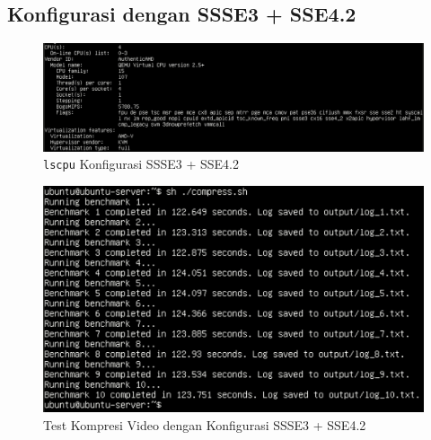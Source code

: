 \subsection{Konfigurasi dengan SSSE3 + SSE4.2}
\begin{figure}
    \centering
    \includegraphics[width=1\textwidth]
    {assets/pics/video-compression-test/lscpu_ssse3,sse4.2.jpeg}
    \caption{\texttt{lscpu} Konfigurasi SSSE3 + SSE4.2}
    \label{fig:lscpu_video_compression_test_ssse3,sse4.2}
\end{figure}

\begin{figure}
    \centering
    \includegraphics[width=1\textwidth]
    {assets/pics/video-compression-test/ssse3,sse4.2.jpeg}
    \caption{Test Kompresi Video dengan Konfigurasi SSSE3 + SSE4.2}
    \label{fig:video_compression_test_ssse3,sse4.2}
\end{figure}

